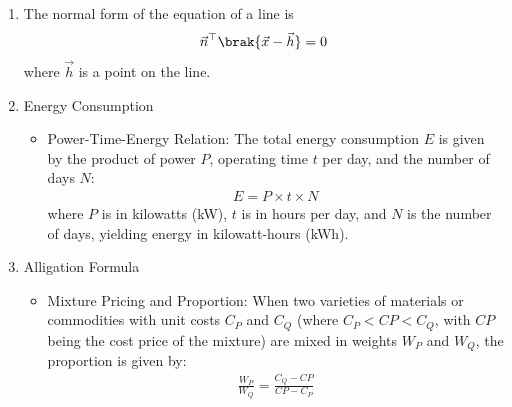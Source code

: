 \begin{enumerate}[label=\thesubsection.\arabic*, ref=\thesubsection.\theenumi,itemsep=0pt]

\iffalse
\item The normal form of the equation of a line is 
\begin{align}
	\vec{n}^{\top}
	\brak{\vec{x}-\vec{h}} = 0
\label{eq:EE26BTECH11213-line-normal-h}
\end{align}
where $\vec{h}$ is a point on the line.
\item Energy Consumption
\begin{itemize}
\item Power-Time-Energy Relation: The total energy consumption $E$ is given by the product of power $P$, operating time $t$ per day, and the number of days $N$:
\begin{align}
E = P \times t \times N \label{eq:energy_consumption}
\end{align}
where $P$ is in kilowatts (kW), $t$ is in hours per day, and $N$ is the number of days, yielding energy in kilowatt-hours (kWh).
\end{itemize}

\item Alligation Formula
\begin{itemize}
\item Mixture Pricing and Proportion: When two varieties of materials or commodities with unit costs $C_P$ and $C_Q$ (where $C_P < CP < C_Q$, with $CP$ being the cost price of the mixture) are mixed in weights $W_P$ and $W_Q$, the proportion is given by:
\begin{align}
\frac{W_P}{W_Q} = \frac{C_Q - CP}{CP - C_P} \label{eq:alligation_formula}
\end{align}
\end{itemize}


\end{enumerate}
